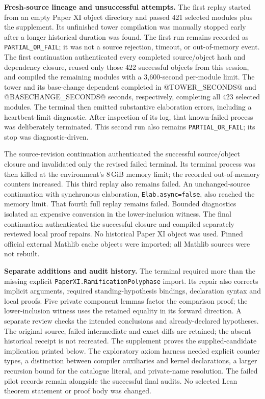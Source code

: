 \textbf{Fresh-source lineage and unsuccessful attempts.}
The first replay started from an empty Paper XI object directory and passed
421 selected modules plus the supplement. Its unfinished tower compilation
was manually stopped early after a longer historical duration was found.
The first run remains recorded as \texttt{PARTIAL\_OR\_FAIL}; it was not a
source rejection, timeout, or out-of-memory event.
The first continuation authenticated every completed source/object hash and
dependency closure, reused only those 422 successful objects from this
session, and compiled the remaining modules with a 3,600-second per-module
limit. The tower and its base-change dependent completed in
@TOWER_SECONDS@ and @BASECHANGE_SECONDS@ seconds, respectively, completing
all 423 selected modules. The terminal then emitted substantive elaboration
errors, including a heartbeat-limit diagnostic. After inspection of its log,
that known-failed process was deliberately terminated. This second run also
remains \texttt{PARTIAL\_OR\_FAIL}; its stop was diagnostic-driven.

The source-revision continuation authenticated the successful source/object
closure and invalidated only the revised failed terminal. Its terminal process
was then killed at the environment's 8\,GiB memory limit; the recorded
out-of-memory counters increased. This third replay also remains failed.
An unchanged-source continuation with synchronous elaboration,
\texttt{Elab.async=false}, also reached the memory limit. That fourth full
replay remains failed. Bounded diagnostics isolated an expensive conversion
in the lower-inclusion witness. The final continuation authenticated the
successful closure and compiled separately reviewed local proof repairs.
No historical Paper XI object was used. Pinned official external Mathlib cache
objects were imported; all Mathlib sources were not rebuilt.

\textbf{Separate additions and audit history.}
The terminal required more than the missing explicit
\nolinkurl{PaperXI.RamificationPolyphase} import. Its repair also corrects
implicit arguments, required standing-hypothesis bindings, declaration syntax
and local proofs. Five private component lemmas factor the comparison proof;
the lower-inclusion witness uses the retained equality in its forward direction.
A separate review checks the intended conclusions and
already-declared hypotheses. The original source, failed intermediate and
exact diffs are retained; the absent historical receipt is not recreated.
The supplement proves the supplied-candidate implication printed below.
The exploratory axiom harness needed explicit counter types, a distinction
between compiler auxiliaries and kernel declarations, a larger recursion
bound for the catalogue literal, and private-name resolution. The failed
pilot records remain alongside the successful final audits. No
selected Lean theorem statement or proof body was changed.

